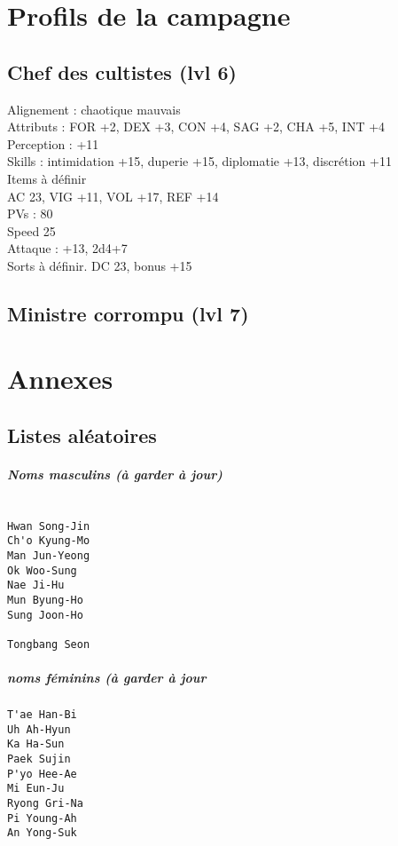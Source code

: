 \documentclass[10pt,a4paper]{book}
\begin{document}
\chapter{Profils de la campagne}

\section{Chef des cultistes (lvl 6)}
Alignement : chaotique mauvais \\
Attributs : FOR +2, DEX +3, CON +4, SAG +2, CHA +5, INT +4\\
Perception : +11\\
Skills : intimidation +15, duperie +15, diplomatie +13, discrétion +11\\
Items à définir\\
AC 23, VIG +11, VOL +17, REF +14\\
PVs : 80\\
Speed 25\\
Attaque : +13, 2d4+7\\
Sorts à définir. DC 23, bonus +15
\section{Ministre corrompu (lvl 7)}

\chapter*{Annexes}
\section*{Listes aléatoires}
\paragraph{Noms masculins (à garder à jour)}
\begin{verbatim}

Hwan Song-Jin
Ch'o Kyung-Mo
Man Jun-Yeong
Ok Woo-Sung
Nae Ji-Hu
Mun Byung-Ho
Sung Joon-Ho

Tongbang Seon
\end{verbatim}
\paragraph{noms féminins (à garder à jour}
\begin{verbatim}
T'ae Han-Bi
Uh Ah-Hyun
Ka Ha-Sun
Paek Sujin
P'yo Hee-Ae
Mi Eun-Ju
Ryong Gri-Na
Pi Young-Ah
An Yong-Suk
\end{verbatim}
\end{document}
